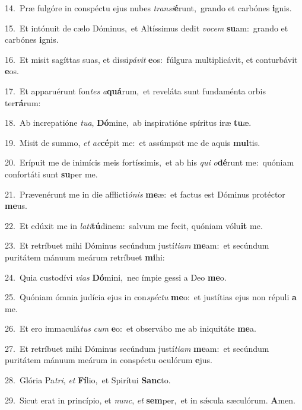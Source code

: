 {\numbfont\textcolor{\numbcolor}{14.}}~Præ fulgóre in conspéctu ejus nubes \textit{trans}\-\textit{i}\textbf{é}runt,~\star grando et carbónes \textbf{i}\-gnis.\par
{\numbfont\textcolor{\numbcolor}{15.}}~Et intónuit de cælo Dóminus,~\dagger et Altíssimus dedit \textit{vo}\-\textit{cem} \textbf{su}\-am:~\star grando et carbónes \textbf{i}\-gnis.\par
{\numbfont\textcolor{\numbcolor}{16.}}~Et misit sagíttas suas, et dissi\-\textit{pá}\-\textit{vit} \textbf{e}\-os:~\star fúlgura multiplicávit, et conturbávit \textbf{e}\-os.\par
{\numbfont\textcolor{\numbcolor}{17.}}~Et apparuérunt fon\textit{tes} \textit{a}\-\textbf{quá}rum,~\star et reveláta sunt fundaménta orbis ter\-\textbf{rá}\-rum:\par
{\numbfont\textcolor{\numbcolor}{18.}}~Ab increpatióne \textit{tu}\-\textit{a}, \textbf{Dó}\-mine,~\star ab inspiratióne spíritus iræ \textbf{tu}\-æ.\par
{\numbfont\textcolor{\numbcolor}{19.}}~Misit de summo, \textit{et} \textit{ac}\-\textbf{cé}pit me:~\star et assúmpsit me de aquis \textbf{mul}\-tis.\par
{\numbfont\textcolor{\numbcolor}{20.}}~Erípuit me de inimícis meis fortíssimis,~\dagger et ab his \textit{qui} \textit{o}\-\textbf{dé}runt me:~\star quóniam confortáti sunt \textbf{su}\-per me.\par
{\numbfont\textcolor{\numbcolor}{21.}}~Prævenérunt me in die afflicti\-\textit{ó}\-\textit{nis} \textbf{me}\-æ:~\star et factus est Dóminus protéctor \textbf{me}\-us.\par
{\numbfont\textcolor{\numbcolor}{22.}}~Et edúxit me in \textit{la}\-\textit{ti}\textbf{tú}dinem:~\star salvum me fecit, quóniam vólu\textbf{it} me.\par
{\numbfont\textcolor{\numbcolor}{23.}}~Et retríbuet mihi Dóminus secúndum justí\-\textit{ti}\-\textit{am} \textbf{me}\-am:~\star et secúndum puritátem mánuum meárum retríbuet \textbf{mi}\-hi:\par
{\numbfont\textcolor{\numbcolor}{24.}}~Quia custodívi \textit{vi}\-\textit{as} \textbf{Dó}\-mini,~\star nec ímpie gessi a Deo \textbf{me}\-o.\par
{\numbfont\textcolor{\numbcolor}{25.}}~Quóniam ómnia judícia ejus in con\-\textit{spéc}\-\textit{tu} \textbf{me}\-o:~\star et justítias ejus non répuli \textbf{a} me.\par
{\numbfont\textcolor{\numbcolor}{26.}}~Et ero immaculá\textit{tus} \textit{cum} \textbf{e}\-o:~\star et observábo me ab iniquitáte \textbf{me}\-a.\par
{\numbfont\textcolor{\numbcolor}{27.}}~Et retríbuet mihi Dóminus secúndum justí\-\textit{ti}\-\textit{am} \textbf{me}\-am:~\star et secúndum puritátem mánuum meárum in conspéctu oculórum \textbf{e}\-jus.\par
{\numbfont\textcolor{\numbcolor}{28.}}~Glória Pa\-\textit{tri}\-, \textit{et} \textbf{Fí}\-lio,~\star et Spirítui \textbf{Sanc}\-to.\par
{\numbfont\textcolor{\numbcolor}{29.}}~Sicut erat in princípio, et \textit{nunc}\-, \textit{et} \textbf{sem}\-per,~\star et in sǽcula sæculórum. \textbf{A}\-men.\par
